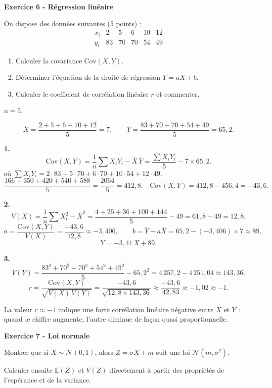 \documentclass[12pt,a4paper]{article}
\begin{document}
\begin{boiteexercice}
\textbf{Exercice 6 - Régression linéaire}\niveau{\moyen}

On dispose des données suivantes (5 points) :
\[
\begin{array}{c|ccccc}
x_i & 2 & 5 & 6 & 10 & 12 \\
\hline
y_i & 83 & 70 & 70 & 54 & 49
\end{array}
\]
\begin{enumerate}
  \item Calculer la covariance $\mathrm{Cov}(X,Y)$.
  \item Déterminer l'équation de la droite de régression $Y = aX + b$.
  \item Calculer le coefficient de corrélation linéaire $r$ et commenter.
\end{enumerate}
\end{boiteexercice}

\begin{boitecorrige}
$n = 5$.

\[
\bar{X} = \frac{2+5+6+10+12}{5} = 7, \qquad \bar{Y} = \frac{83+70+70+54+49}{5} = 65{,}2.
\]

\textbf{1.}
\[
\mathrm{Cov}(X,Y) = \frac{1}{n}\sum X_i Y_i - \bar{X}\,\bar{Y}
= \frac{\sum X_i Y_i}{5} - 7 \times 65{,}2.
\]
où $\sum X_i Y_i = 2\cdot83 + 5\cdot70 + 6\cdot70 + 10\cdot54 + 12\cdot49$.
\[
\frac{166 + 350 + 420 + 540 + 588}{5} = \frac{2064}{5} = 412{,}8.
\quad \mathrm{Cov}(X,Y) = 412{,}8 - 456{,}4 = -43{,}6.
\]

\textbf{2.}
\[
V(X) = \frac{1}{n}\sum X_i^2 - \bar{X}^2 = \frac{4+25+36+100+144}{5} - 49 = 61{,}8 - 49 = 12{,}8.
\]
\[
a = \frac{\mathrm{Cov}(X,Y)}{V(X)} = \frac{-43{,}6}{12{,}8} \approx -3{,}406, \qquad
b = \bar{Y} - a\bar{X} = 65{,}2 - (-3{,}406)\times 7 \approx 89.
\]
\[
\boxed{Y = -3{,}41\,X + 89.}
\]

\textbf{3.}
\[
V(Y) = \frac{83^2+70^2+70^2+54^2+49^2}{5} - 65{,}2^2 = 4\,257{,}2 - 4\,251{,}04 \approx 143{,}36.
\]
\[
r = \frac{\mathrm{Cov}(X,Y)}{\sqrt{V(X)\,V(Y)}} = \frac{-43{,}6}{\sqrt{12{,}8 \times 143{,}36}} \approx \frac{-43{,}6}{42{,}83} \approx -1{,}02 \approx -1.
\]

La valeur $r \approx -1$ indique une forte corrélation linéaire négative entre $X$ et $Y$ : quand le chiffre augmente, l'autre diminue de façon quasi proportionnelle.
\end{boitecorrige}

\begin{boiteexercice}
\textbf{Exercice 7 - Loi normale}\niveau{\moyen}

Montrer que si $X \sim \mathcal{N}(0,1)$, alors $Z = \sigma X + m$ suit une loi $\mathcal{N}(m, \sigma^2)$.

Calculer ensuite $\mathbb{E}(Z)$ et $V(Z)$ directement à partir des propriétés de l'espérance et de la variance.
\end{boiteexercice}
\end{document}
